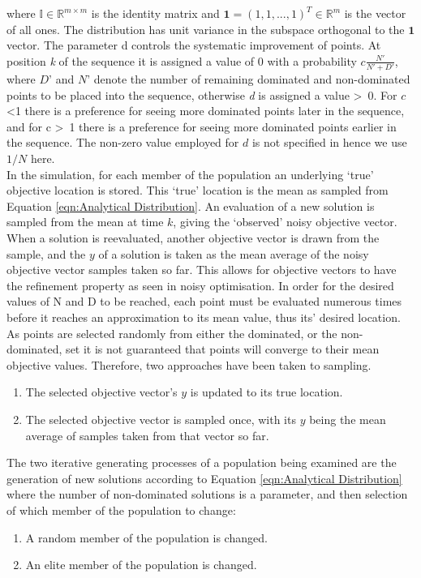 \documentclass{ecmm427_assignment}
\begin{document}
where $\mathbb{I} \in \mathbb{R} ^ {m \times m}$ is the identity matrix and $\mathbf{1} = (1, 1, ..., 1) ^T \in \mathbb{R} ^ m$ is the vector of all ones. The distribution has unit variance in the subspace orthogonal to the $\mathbf{1}$ vector. The parameter d controls the systematic improvement of points. At position \textit{k} of the sequence it is assigned a value of 0 with a probability $c \frac{N'}{N' + D'}$, where $D$' and $N$' denote the number of remaining dominated and non-dominated points to be placed into the sequence, otherwise \textit{d} is assigned a value \textgreater\ 0. For $c$ \textless  1 there is a preference for seeing more dominated points later in the sequence, and for c \textgreater\ 1 there is a preference for seeing more dominated points earlier in the sequence. The non-zero value employed for $d$ is not specified in \cite{Glasmachers2017} hence we use $1/N$ here.\\
In the simulation, for each member of the population an underlying `true' objective location is stored. This `true' location is the mean as sampled from Equation \ref{eqn:Analytical Distribution}. An evaluation of a new solution is sampled from the mean at time $k$, giving the `observed' noisy objective vector. When a solution is reevaluated, another objective vector is drawn from the sample, and the $y$ of a solution is taken as the mean average of the noisy objective vector samples taken so far. This allows for objective vectors to have the refinement property as seen in noisy optimisation. In order for the desired values of N and D to be reached, each point must be evaluated numerous times before it reaches an approximation to its mean value, thus its' desired location. As points are selected randomly from either the dominated, or the non-dominated, set it is not guaranteed that points will converge to their mean objective values. Therefore, two approaches have been taken to sampling.
\begin{enumerate}
    \item The selected objective vector's $y$ is updated to its true location.
    \item The selected objective vector is sampled once, with its $y$ being the mean average of samples taken from that vector so far.
\end{enumerate}

The two iterative generating processes of a population being examined are the generation of new solutions according to Equation \ref{eqn:Analytical Distribution} where the number of non-dominated solutions is a parameter, and then selection of which member of the population to change:
\begin{enumerate}
    \item A random member of the population is changed.
    \item An elite member of the population is changed.
\end{enumerate}
\end{document}
